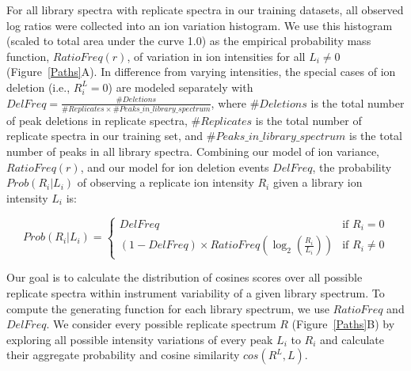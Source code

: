 \documentclass[endnotes,11pt]{article}
\begin{document}
For all library spectra with replicate spectra in our training datasets, all observed log ratios were collected into an ion variation histogram. We use this histogram (scaled to total area under the curve 1.0) as the empirical probability mass function, $RatioFreq(r)$, of variation in ion intensities for all $L_i \neq 0$ (Figure~\ref{Paths}A). In difference from varying intensities, the special cases of ion deletion (i.e., $R_i^L = 0$) are modeled separately with $DelFreq = \frac{\#Deletions}{\#Replicates \times \#Peaks\_in\_library\_spectrum}$, where $\#Deletions$ is the total number of peak deletions in replicate spectra, $\#Replicates$ is the total number of replicate spectra in our training set, and $\#Peaks\_in\_library\_spectrum$ is the total number of peaks in all library spectra. Combining our model of ion variance, $RatioFreq(r)$, and our model for ion deletion events $DelFreq$, the probability $Prob( R_i | L_i)$ of observing a replicate ion intensity $R_i$ given a library ion intensity $L_i$ is:

$$
Prob( R_i | L_i) =
        \left\{ \begin{array}{ll}
            DelFreq & \mbox{if\ } R_i = 0\\
            (1-DelFreq)\times RatioFreq( \log_2( \frac{ R_i }{ L_i }  )) & \mbox{if\ } R_i\neq 0
        \end{array}
        \right.
$$




Our goal is to calculate the distribution of cosines scores over all possible replicate spectra within instrument variability of a given library spectrum. To compute the generating function for each library spectrum, we use $RatioFreq$ and $DelFreq$. We consider every possible replicate spectrum $R$ (Figure~\ref{Paths}B) by exploring all possible intensity variations of every peak $L_i$ to $R_i$ and calculate their aggregate probability and cosine similarity $cos(R^L, L)$.
\end{document}
